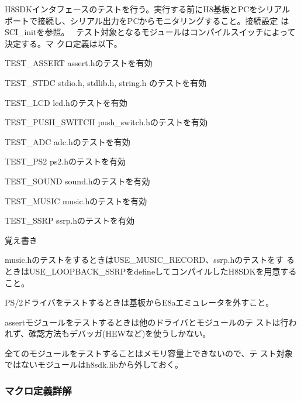 H8\+S\+D\+Kインタフェースのテストを行う。実行する前に\+H8基板と\+P\+Cをシリアル ポートで接続し、シリアル出力を\+P\+Cからモニタリングすること。接続設定 は\+S\+C\+I\+\_\+initを参照。~\newline
テスト対象となるモジュールはコンパイルスイッチによって決定する。マ クロ定義は以下。

\begin{DoxyItemize}
\item {\ttfamily T\+E\+S\+T\+\_\+\+A\+S\+S\+E\+R\+T} assert.\+hのテストを有効 \item {\ttfamily T\+E\+S\+T\+\_\+\+S\+T\+D\+C} stdio.\+h, stdlib.\+h, string.\+h のテストを有効 \item {\ttfamily T\+E\+S\+T\+\_\+\+L\+C\+D} lcd.\+hのテストを有効 \item {\ttfamily T\+E\+S\+T\+\_\+\+P\+U\+S\+H\+\_\+\+S\+W\+I\+T\+C\+H} push\+\_\+switch.\+hのテストを有効 \item {\ttfamily T\+E\+S\+T\+\_\+\+A\+D\+C} adc.\+hのテストを有効 \item {\ttfamily T\+E\+S\+T\+\_\+\+P\+S2} ps2.\+hのテストを有効 \item {\ttfamily T\+E\+S\+T\+\_\+\+S\+O\+U\+N\+D} sound.\+hのテストを有効 \item {\ttfamily T\+E\+S\+T\+\_\+\+M\+U\+S\+I\+C} music.\+hのテストを有効 \item {\ttfamily T\+E\+S\+T\+\_\+\+S\+S\+R\+P} ssrp.\+hのテストを有効\end{DoxyItemize}
\begin{DoxyNote}{覚え書き}
\begin{DoxyItemize}
\item music.\+hのテストをするときは\+U\+S\+E\+\_\+\+M\+U\+S\+I\+C\+\_\+\+R\+E\+C\+O\+R\+D、ssrp.\+hのテストをす るときは\+U\+S\+E\+\_\+\+L\+O\+O\+P\+B\+A\+C\+K\+\_\+\+S\+S\+R\+Pをdefineしてコンパイルした\+H8\+S\+D\+Kを用意する こと。 \item P\+S/2ドライバをテストするときは基板から\+E8aエミュレータを外すこと。 \item assertモジュールをテストするときは他のドライバとモジュールのテ ストは行われず、確認方法もデバッガ(H\+E\+Wなど)を使うしかない。 \item 全てのモジュールをテストすることはメモリ容量上できないので、テ スト対象ではないモジュールはh8sdk.\+libから外しておく。\end{DoxyItemize}
 
\end{DoxyNote}


\subsubsection{マクロ定義詳解}
